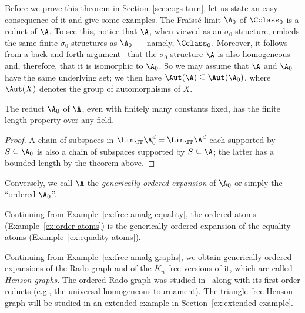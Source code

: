 Before we prove this theorem in Section~\ref{sec:cogs-turn}, let us state an easy consequence of it and give some examples.
The Fraïssé limit $\A_0$ of $\Cclass_0$ is a reduct of $\A$.
To see this, notice that $\A$, when viewed as an $\sigma_0$-structure, embeds the same finite $\sigma_0$-structures as $\A_0$ --- namely, $\Cclass_0$.
Moreover, it follows from a back-and-forth argument~\cite[Lem.~7.1.4]{hodges1993model} that the $\sigma_0$-structure $\A$ is also homogeneous and, therefore, that it is isomorphic to $\A_0$.
So we may assume that $\A$ and $\A_0$ have the same underlying set; we then have $\Aut(\A) \subseteq \Aut(\A_0)$, where $\Aut(X)$ denotes the group of automorphisms of $X$.

\begin{corollary}\label{cor:free-finite-length}
    The reduct $\A_0$ of $\A$, even with finitely many constants fixed, has the finite length property over any field.
\end{corollary}
\begin{proof}
    A chain of subspaces in $\Lin_\FF \A_0^d = \Lin_\FF \A^d$ each supported by $S \subseteq \A_0$ is also a chain of subspaces supported by $S \subseteq \A$; 
    the latter has a bounded length by the theorem above.
\end{proof}

Conversely, we call $\A$ the \emph{generically ordered expansion} of $\A_0$ or simply the ``ordered $\A_0$''.

\begin{myexample}\label{ex:generically-ordered-equality}
    Continuing from Example~\ref{ex:free-amalg-equality},
    the ordered atoms (Example~\ref{ex:order-atoms}) is the generically ordered expansion of the equality atoms (Example~\ref{ex:equality-atoms}).
\end{myexample}

\begin{myexample}\label{ex:generically-ordered-graphs}
    Continuing from Example~\ref{ex:free-amalg-graphs}, we obtain generically ordered expansions of the Rado graph and of the $K_n$-free versions of it, which are called \emph{Henson graphs}.
    The ordered Rado graph was studied in~\cite{BPP15} along with its first-order reducts (e.g., the universal homogeneous tournament). The triangle-free  Henson graph will be studied in an extended example in Section~\ref{ex:extended-example}.
\end{myexample}

